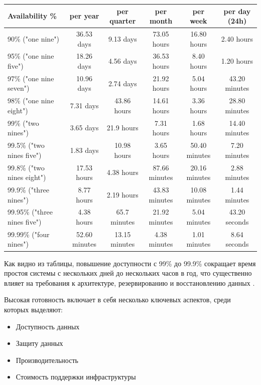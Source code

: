 \begin{center}
    \begin{tabular}{|l|c|c|c|c|c|}
        \hline
        \textbf{Availability \%} & \textbf{per year} & \textbf{per quarter} & \textbf{per month} & \textbf{per week} & \textbf{per day (24h)} \\
        \hline
        90\% ("one nine")       & 36.53 days  & 9.13 days   & 73.05 hours & 16.80 hours & 2.40 hours \\
        \hline
        95\% ("one nine five")  & 18.26 days  & 4.56 days   & 36.53 hours & 8.40 hours  & 1.20 hours \\
        \hline
        97\% ("one nine seven") & 10.96 days  & 2.74 days   & 21.92 hours & 5.04 hours  & 43.20 minutes \\
        \hline
        98\% ("one nine eight") & 7.31 days   & 43.86 hours & 14.61 hours & 3.36 hours  & 28.80 minutes \\
        \hline
        99\% ("two nines")      & 3.65 days   & 21.9 hours  & 7.31 hours  & 1.68 hours  & 14.40 minutes \\
        \hline
        99.5\% ("two nines five") & 1.83 days & 10.98 hours & 3.65 hours  & 50.40 minutes & 7.20 minutes \\
        \hline
        99.8\% ("two nines eight") & 17.53 hours & 4.38 hours & 87.66 minutes & 20.16 minutes & 2.88 minutes \\
        \hline
        99.9\% ("three nines")  & 8.77 hours  & 2.19 hours  & 43.83 minutes & 10.08 minutes & 1.44 minutes \\
        \hline
        99.95\% ("three nines five") & 4.38 hours & 65.7 minutes & 21.92 minutes & 5.04 minutes & 43.20 seconds \\
        \hline
        99.99\% ("four nines")  & 52.60 minutes & 13.15 minutes & 4.38 minutes & 1.01 minutes & 8.64 seconds \\
        \hline
    \end{tabular}
\end{center}

Как видно из таблицы, повышение доступности с 99\% до 99.9\% сокращает время простоя системы с нескольких дней до нескольких часов в год, что существенно влияет на требования к архитектуре, резервированию и восстановлению данных \autocite{RajeshKumar}.

Высокая готовность включает в себя несколько ключевых аспектов, среди которых выделяют:
\begin{itemize}
    \item Доступность данных
    \item Защиту данных
    \item Производительность
    \item Стоимость поддержки инфраструктуры
\end{itemize}

